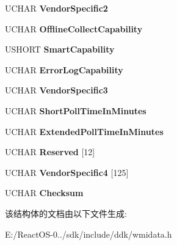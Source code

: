\begin{DoxyCompactItemize}
U\+C\+H\+AR {\bfseries Vendor\+Specific2}
\item 
\mbox{\label{struct___a_t_a_p_i___f_a_i_l_u_r_e___p_r_e_d_i_c_t___d_a_t_a_aa9df2792d4408c969af5c263df1e316f}} 
U\+C\+H\+AR {\bfseries Offline\+Collect\+Capability}
\item 
\mbox{\label{struct___a_t_a_p_i___f_a_i_l_u_r_e___p_r_e_d_i_c_t___d_a_t_a_a589630f92f077e59c0732d828440e6c5}} 
U\+S\+H\+O\+RT {\bfseries Smart\+Capability}
\item 
\mbox{\label{struct___a_t_a_p_i___f_a_i_l_u_r_e___p_r_e_d_i_c_t___d_a_t_a_af3b24e32df6b8f37616b6ea3697b60e6}} 
U\+C\+H\+AR {\bfseries Error\+Log\+Capability}
\item 
\mbox{\label{struct___a_t_a_p_i___f_a_i_l_u_r_e___p_r_e_d_i_c_t___d_a_t_a_a954aa077a093b6d4d86b3cec3e3885fa}} 
U\+C\+H\+AR {\bfseries Vendor\+Specific3}
\item 
\mbox{\label{struct___a_t_a_p_i___f_a_i_l_u_r_e___p_r_e_d_i_c_t___d_a_t_a_aae8a959dd9b6a6c279ab61036826ebce}} 
U\+C\+H\+AR {\bfseries Short\+Poll\+Time\+In\+Minutes}
\item 
\mbox{\label{struct___a_t_a_p_i___f_a_i_l_u_r_e___p_r_e_d_i_c_t___d_a_t_a_a51bc78d51386d488694a21076686e94c}} 
U\+C\+H\+AR {\bfseries Extended\+Poll\+Time\+In\+Minutes}
\item 
\mbox{\label{struct___a_t_a_p_i___f_a_i_l_u_r_e___p_r_e_d_i_c_t___d_a_t_a_a4444b9b3b1e52f8aaf5a2bece3e7096a}} 
U\+C\+H\+AR {\bfseries Reserved} \mbox{[}12\mbox{]}
\item 
\mbox{\label{struct___a_t_a_p_i___f_a_i_l_u_r_e___p_r_e_d_i_c_t___d_a_t_a_aaeb8f6c06867204b3678cc05440d4a9d}} 
U\+C\+H\+AR {\bfseries Vendor\+Specific4} \mbox{[}125\mbox{]}
\item 
\mbox{\label{struct___a_t_a_p_i___f_a_i_l_u_r_e___p_r_e_d_i_c_t___d_a_t_a_ac90d8e826487fa7bb4758eb2f1520b5b}} 
U\+C\+H\+AR {\bfseries Checksum}
\end{DoxyCompactItemize}


该结构体的文档由以下文件生成\+:\begin{DoxyCompactItemize}
\item 
E\+:/\+React\+O\+S-\/0../sdk/include/ddk/wmidata.\+h\end{DoxyCompactItemize}
